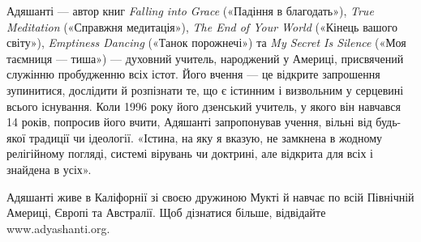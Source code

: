 Адяшанті — автор книг \emph{Falling into Grace} («Падіння в благодать»), \emph{True Meditation} («Справжня медитація»), \emph{The End of Your World} («Кінець вашого світу»), \emph{Emptiness Dancing} («Танок порожнечі») та \emph{My Secret Is Silence} («Моя таємниця — тиша») — духовний учитель, народжений у Америці, присвячений служінню пробудженню всіх істот. Його вчення — це відкрите запрошення зупинитися, дослідити й розпізнати те, що є істинним і визвольним у серцевині всього існування. Коли 1996 року його дзенський учитель, у якого він навчався 14 років, попросив його вчити, Адяшанті запропонував учення, вільні від будь-якої традиції чи ідеології. «Істина, на яку я вказую, не замкнена в жодному релігійному погляді, системі вірувань чи доктрині, але відкрита для всіх і знайдена в усіх».

Адяшанті живе в Каліфорнії зі своєю дружиною Мукті й навчає по всій Північній Америці, Європі та Австралії. Щоб дізнатися більше, відвідайте www.adyashanti.org.
